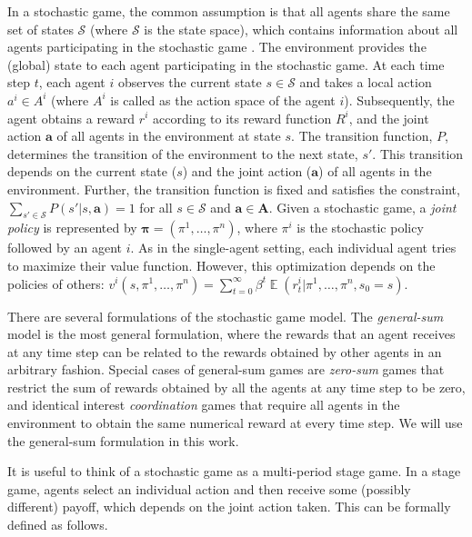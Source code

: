 \documentclass[jair, twoside,11pt,theapa]{article}
\DeclareMathOperator{\E}{\mathbb{E}}
\begin{document}
In a stochastic game, the common assumption is that all agents share the same set of states $\mathcal{S}$ (where $\mathcal{S}$ is the state space), which contains information about all agents participating in the stochastic game \citep{shapley1953stochastic}. The environment provides the (global) state to each agent participating in the stochastic game. At each time step $t$, each agent $i$ observes the current state $s \in \mathcal{S}$ and takes a local action $a^i \in A^i$ (where $A^i$ is called as the action space of the agent $i$). Subsequently, the agent obtains a reward $r^i$ according to its reward function $R^i$, and the joint action $\boldsymbol{a}$ of all agents in the environment at state $s$. The transition function, $P$, determines the transition of the environment to the next state, $s'$.   This transition depends on the current state ($s$) and the joint action ($\boldsymbol{a}$) of all agents in the environment. Further, the transition function is fixed and satisfies the constraint, $\sum_{s'\in \mathcal{S}} P(s' |s, \boldsymbol{a}) = 1$ for all $s \in \mathcal{S} $ and $\boldsymbol{a} \in \boldsymbol{A}$. Given a stochastic game, a \emph{joint policy} is represented by $\boldsymbol{\pi}=(\pi^1,\ldots,\pi^n)$, where $\pi^i$ is the stochastic policy followed by an agent $i$. 
As in the single-agent setting, each individual agent tries to maximize their value function. However, this optimization depends on the policies of others: $
     v^i(s, \pi^1, \ldots, \pi^n) = \sum_{t=0}^{\infty} \beta^t \E (r^i_t | \pi^1, \ldots, \pi^n, s_0 = s)$.


There are several formulations of the stochastic game model. The \emph{general-sum} model is the most general formulation, where the rewards that an agent receives at any time step can be related to the rewards obtained by other agents in an arbitrary fashion. Special cases of general-sum games are \emph{zero-sum} games that restrict the sum of rewards obtained by all the agents at any time step to be zero, and identical interest \emph{coordination} games that require all agents in the environment to obtain the same numerical reward at every time step. We will use the general-sum formulation in this work. 


 It is useful to think of a stochastic game as a multi-period stage game.
In a stage game, agents select an individual action and then receive some (possibly different) payoff, which depends on the joint action taken.
This can be formally defined as follows.
\end{document}
